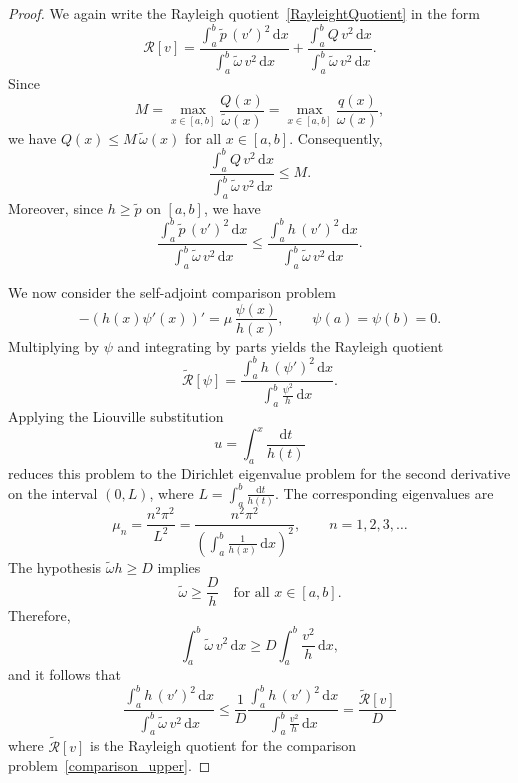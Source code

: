 \documentclass[10pt,a4paper]{amsart}
\begin{document}
\begin{proof}
We again write the Rayleigh quotient~\eqref{RayleightQuotient} in the form
\[
\mathcal{R}[v]
= \frac{\displaystyle\int_a^b \tilde{p}\,(v')^2\,\mathrm{d}x}
       {\displaystyle\int_a^b \tilde{\omega}\,v^2\,\mathrm{d}x}
+ \frac{\displaystyle\int_a^b Q\,v^2\,\mathrm{d}x}
       {\displaystyle\int_a^b \tilde{\omega}\,v^2\,\mathrm{d}x}.
\]
Since
\[
M=\max_{x\in[a,b]}\frac{Q(x)}{\tilde{\omega}(x)}
   =\max_{x\in[a,b]}\frac{q(x)}{\omega(x)},
\]
we have $Q(x)\le M\,\tilde{\omega}(x)$ for all $x\in[a,b]$. Consequently,
\[
\frac{\displaystyle\int_a^b Q\,v^2\,\mathrm{d}x}
     {\displaystyle\int_a^b \tilde{\omega}\,v^2\,\mathrm{d}x}
\le M.
\]
Moreover, since $h\ge\tilde{p}$ on $[a,b]$, we have
\[
\frac{\displaystyle\int_a^b \tilde{p}\,(v')^2\,\mathrm{d}x}
     {\displaystyle\int_a^b \tilde{\omega}\,v^2\,\mathrm{d}x}
\le
\frac{\displaystyle\int_a^b h\,(v')^2\,\mathrm{d}x}
     {\displaystyle\int_a^b \tilde{\omega}\,v^2\,\mathrm{d}x}.
\]

We now consider the self-adjoint comparison problem
\begin{equation}\label{comparison_upper}
-(h(x)\psi'(x))' = \mu\,\frac{\psi(x)}{h(x)},
\qquad
\psi(a)=\psi(b)=0.
\end{equation}
Multiplying by $\psi$ and integrating by parts yields the Rayleigh quotient
\[
\tilde{\mathcal{R}}[\psi]
=
\frac{\displaystyle\int_a^b h\,(\psi')^2\,\mathrm{d}x}
     {\displaystyle\int_a^b \frac{\psi^2}{h}\,\mathrm{d}x}.
\]
Applying the Liouville substitution
\[
u=\int_a^x \frac{\mathrm{d}t}{h(t)}
\]
reduces this problem to the Dirichlet eigenvalue problem for the second derivative on the interval
\(
(0,L)
\),
where
\(
L=\int_a^b \frac{\mathrm{d}t}{h(t)}.
\)
The corresponding eigenvalues are
\[
\mu_n
=
\frac{n^2\pi^2}{L^2}
=
\frac{n^2\pi^2}
{\left(\displaystyle\int_a^b \frac{1}{h(x)}\,\mathrm{d}x\right)^2},
\qquad n=1,2,3,\ldots
\]
The hypothesis $\tilde{\omega}h\ge D$ implies
\[
\tilde{\omega}\ge \frac{D}{h} \quad \text{for all } x\in[a,b].
\]
Therefore,
\[
\int_a^b \tilde{\omega}\,v^2\,\mathrm{d}x
\ge
D\int_a^b \frac{v^2}{h}\,\mathrm{d}x,
\]
and it follows that
\[
\frac{\displaystyle\int_a^b h\,(v')^2\,\mathrm{d}x}
     {\displaystyle\int_a^b \tilde{\omega}\,v^2\,\mathrm{d}x}
\le
\frac{1}{D}
\frac{\displaystyle\int_a^b h\,(v')^2\,\mathrm{d}x}
     {\displaystyle\int_a^b \frac{v^2}{h}\,\mathrm{d}x}=\dfrac{\tilde{\mathcal{R}}[v]}{D}
\]
where $\tilde{\mathcal{R}}[v]$ is the Rayleigh quotient for the comparison problem~\eqref{comparison_upper}. 


\end{proof}
\end{document}
